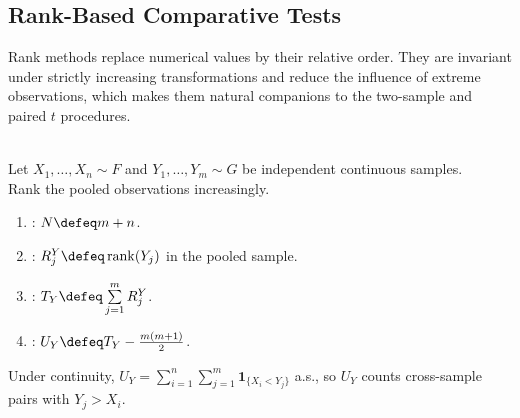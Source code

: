\subsection{Rank-Based Comparative Tests}
\label{subsec:rank-based-comparative-tests}

Rank methods replace numerical values by their relative order.  They are invariant under strictly increasing transformations and reduce the influence of extreme observations, which makes them natural companions to the two-sample and paired $t$ procedures.

\begin{definition} \label{def:mann-whitney-rank-sum-statistics} \\
Let $X_1,\ldots,X_n\sim F$ and $Y_1,\ldots,Y_m\sim G$ be independent continuous samples.\\
Rank the pooled observations increasingly.
\begin{enumerate}[label=(\roman*)]
\setlength{\itemsep}{0pt}
\item {}: $N\defeq m+n$.
\item {}: $R_j^Y\defeq\operatorname{rank}(Y_j)$ in the pooled sample.
\item {}: $T_Y\defeq\sum\limits_{j=1}^mR_j^Y$.
\item {}: $U_Y\defeq T_Y-\frac{m(m+1)}{2}$.
\end{enumerate}
Under continuity, $U_Y=\sum\limits_{i=1}^n\sum\limits_{j=1}^m\mathbf{1}_{\{X_i<Y_j\}}$ a.s., so $U_Y$ counts cross-sample pairs with $Y_j>X_i$.
\end{definition}


